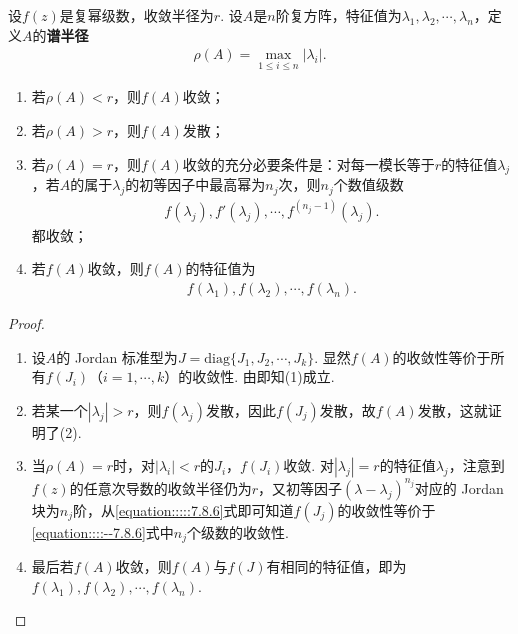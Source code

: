\documentclass[../../main.tex]{subfiles}
\begin{document}
\begin{theorem}\label{theorem:复方阵幂级数的谱半径}
设\(f(z)\)是复幂级数，收敛半径为\(r\). 设\(A\)是\(n\)阶复方阵，特征值为\(\lambda_1,\lambda_2,\cdots,\lambda_n\)，定义\(A\)的\textbf{谱半径}
\begin{align*}
\rho(A) = \max_{1 \leqslant  i \leqslant  n}|\lambda_i|.
\end{align*}
\begin{enumerate}[(1)]
\item 若\(\rho(A) < r\)，则\(f(A)\)收敛；

\item 若\(\rho(A) > r\)，则\(f(A)\)发散；

\item 若\(\rho(A) = r\)，则\(f(A)\)收敛的充分必要条件是：对每一模长等于\(r\)的特征值\(\lambda_j\)，若\(A\)的属于\(\lambda_j\)的初等因子中最高幂为\(n_j\)次，则\(n_j\)个数值级数
\begin{align}
f(\lambda_j), f'(\lambda_j), \cdots, f^{(n_j - 1)}(\lambda_j) .\label{equation::::--7.8.6}
\end{align}
都收敛；

\item 若\(f(A)\)收敛，则\(f(A)\)的特征值为
\begin{align*}
f(\lambda_1), f(\lambda_2), \cdots, f(\lambda_n).
\end{align*} 
\end{enumerate}
\end{theorem}
\begin{proof}
\begin{enumerate}[(1)]
\item 设\(A\)的 Jordan 标准型为\(J = \mathrm{diag}\{J_1,J_2,\cdots,J_k\}\). 显然\(f(A)\)的收敛性等价于所有\(f(J_i)\)（\(i = 1,\cdots,k\)）的收敛性. 由即知(1)成立.

\item 若某一个\(|\lambda_j| > r\)，则\(f(\lambda_j)\)发散，因此\(f(J_j)\)发散，故\(f(A)\)发散，这就证明了(2).

\item 当\(\rho(A) = r\)时，对\(|\lambda_i| < r\)的\(J_i\)，\(f(J_i)\)收敛. 对\(|\lambda_j| = r\)的特征值\(\lambda_j\)，注意到\(f(z)\)的任意次导数的收敛半径仍为\(r\)，又初等因子\((\lambda - \lambda_j)^{n_j}\)对应的 Jordan 块为\(n_j\)阶，从\eqref{equation:::::7.8.6}式即可知道\(f(J_j)\)的收敛性等价于\eqref{equation::::--7.8.6}式中\(n_j\)个级数的收敛性.

\item 最后若\(f(A)\)收敛，则\(f(A)\)与\(f(J)\)有相同的特征值，即为\(f(\lambda_1),f(\lambda_2),\cdots,f(\lambda_n)\).
\end{enumerate}
\end{proof}
\end{document}
